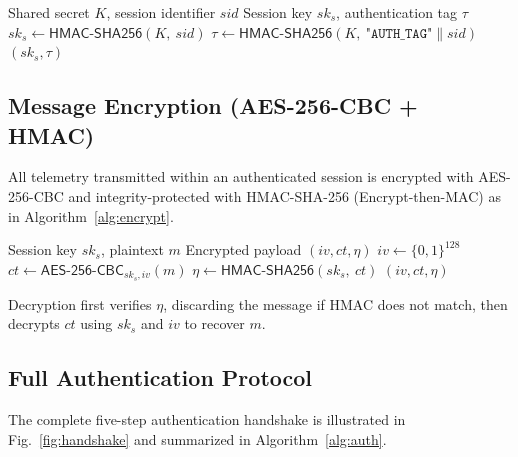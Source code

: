 \documentclass[conference]{IEEEtran}
\begin{document}
\begin{algorithm}[!t]
\caption{Session Key Derivation}\label{alg:session}
\begin{algorithmic}[1]
\REQUIRE Shared secret $K$, session identifier $\mathit{sid}$
\ENSURE Session key $sk_s$, authentication tag $\tau$
\STATE $sk_s  \leftarrow \textsf{HMAC-SHA256}(K,\ \mathit{sid})$
\STATE $\tau  \leftarrow \textsf{HMAC-SHA256}(K,\ \texttt{"AUTH\_TAG"} \| \mathit{sid})$
\RETURN $(sk_s, \tau)$
\end{algorithmic}
\end{algorithm}

\subsection{Message Encryption (AES-256-CBC + HMAC)}

All telemetry transmitted within an authenticated session is encrypted with AES-256-CBC
and integrity-protected with HMAC-SHA-256 (Encrypt-then-MAC) as in
Algorithm~\ref{alg:encrypt}.

\begin{algorithm}[!t]
\caption{Message Encryption (Encrypt-then-MAC)}\label{alg:encrypt}
\begin{algorithmic}[1]
\REQUIRE Session key $sk_s$, plaintext $m$
\ENSURE Encrypted payload $(iv, ct, \eta)$
\STATE $iv  \leftarrow \{0,1\}^{128}$                     
\STATE $ct  \leftarrow \textsf{AES-256-CBC}_{sk_s,iv}(m)$ 
\STATE $\eta \leftarrow \textsf{HMAC-SHA256}(sk_s,\ ct)$  
\RETURN $(iv, ct, \eta)$
\end{algorithmic}
\end{algorithm}

Decryption first verifies $\eta$, discarding the message if HMAC does not match, then
decrypts $ct$ using $sk_s$ and $iv$ to recover $m$.

\subsection{Full Authentication Protocol}
\label{sec:protocol}

The complete five-step authentication handshake is illustrated in
Fig.~\ref{fig:handshake} and summarized in Algorithm~\ref{alg:auth}.
\end{document}
